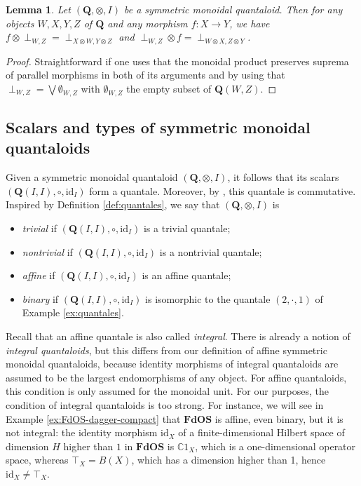 \documentclass[12pt]{tac}
\newtheorem{lemma}[theorem]{Lemma}
\theoremstyle{definition}
\theoremstyle{remark}
\newcommand{\CC}{\mathbb C}
\newcommand{\<}{\langle}
\renewcommand{\>}{\rangle}
\renewcommand{\:}{\colon}
\newcommand{\id}{\mathrm{id}}
\begin{document}
\begin{lemma}\label{lem:tensor preserves least elements in symmetric monoidal quantaloids}
    Let $(\mathbf Q,\otimes,I)$ be a symmetric monoidal quantaloid. Then for any objects $W,X,Y,Z$ of $\mathbf Q$ and any morphism $f:X\to Y$, we have $f\otimes\perp_{W,Z}=\perp_{X\otimes W,Y\otimes Z}$ and $\perp_{W,Z}\otimes f=\perp_{W\otimes X,Z\otimes Y}$.
\end{lemma}
\begin{proof}
Straightforward if one uses that the monoidal product preserves suprema of parallel morphisms in both of its arguments and by using that $\perp_{W,Z}=\bigvee\emptyset_{W,Z}$ with $\emptyset_{W,Z}$ the empty subset of $\mathbf Q(W,Z)$.
\end{proof}



\subsection{Scalars and types of symmetric monoidal quantaloids}\label{subsec:scalars of quantaloids}
Given a symmetric monoidal quantaloid $(\mathbf Q,\otimes,I)$, it follows that its scalars $(\mathbf Q(I,I),\circ,\id_I)$ form a quantale. Moreover, by \cite[Lemma 2.3]{heunenvicary}, this quantale is commutative.  
Inspired by Definition \ref{def:quantales}, we say that $(\mathbf Q,\otimes, I)$ is 
\begin{itemize}
\item \emph{trivial} if $(\mathbf Q(I,I),\circ,\id_I)$ is a trivial quantale;
    \item \emph{nontrivial} if $(\mathbf Q(I,I),\circ,\id_I)$ is a nontrivial quantale;
    \item \emph{affine} if $(\mathbf Q(I,I),\circ,\id_I)$ is an affine quantale;
    \item \emph{binary} if $(\mathbf Q(I,I),\circ,\id_I)$ is isomorphic to the quantale $(2,\cdot,1)$ of Example \ref{ex:quantales}.
\end{itemize}





Recall that an affine quantale is also called \emph{integral}. There is already a notion of \emph{integral quantaloids}, but this differs from our definition of affine symmetric monoidal quantaloids, because identity morphisms of integral quantaloids are assumed to be the largest endomorphisms of any object. For affine quantaloids, this condition is only assumed for the monoidal unit. For our purposes, the condition of integral quantaloids is too strong. For instance, we will see in Example \ref{ex:FdOS-dagger-compact} that $\mathbf{FdOS}$ is affine, even binary, but it is not integral: the identity morphism $\id_X$ of a finite-dimensional Hilbert space of dimension $H$ higher than $1$ in $\mathbf{FdOS}$ is $\CC 1_X$, which is a one-dimensional operator space, whereas $\top_X=B(X)$, which has a dimension higher than 1, hence $\id_X\neq\top_X$. 
\end{document}
